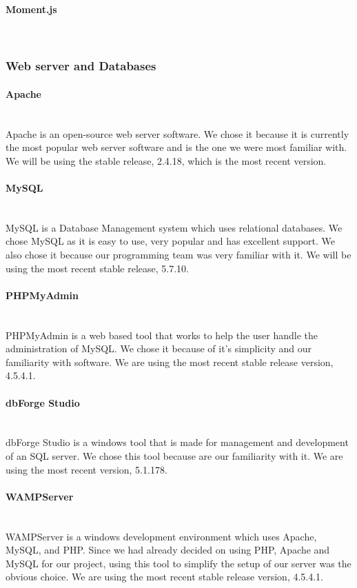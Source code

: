 \documentclass[12pt]{article}
\begin{document}
\paragraph*{Moment.js}~\\
%
%
%
\subsubsection{Web server and Databases} \label{webanddata}
\paragraph*{Apache}~\\
Apache is an open-source web server software. We chose it because it is currently the most popular web server software and is the one we were most familiar with. We will be using the stable release, 2.4.18, which is the most recent version.
%
\paragraph*{MySQL}~\\
MySQL is a Database Management system which uses relational databases. We chose MySQL as it is easy to use, very popular and has excellent support. We also chose it because our programming team was very familiar with it. We will be using the most recent stable release, 5.7.10.
%
\paragraph*{PHPMyAdmin}~\\
PHPMyAdmin is a web based tool that works to help the user handle the administration of MySQL. We chose it because of it's simplicity and our familiarity with software. We are using the most recent stable release version, 4.5.4.1.
%
\paragraph*{dbForge Studio}~\\
dbForge Studio is a windows tool that is made for management and development of an SQL server. We chose this tool because are our familiarity with it. We are using the most recent version, 5.1.178.
%
\paragraph*{WAMPServer}~\\
WAMPServer is a windows development environment which uses Apache, MySQL, and PHP. Since we had already decided on using PHP, Apache and MySQL for our project, using this tool to simplify the setup of our server was the obvious choice. We are using the most recent stable release version, 4.5.4.1.
%
\end{document}
